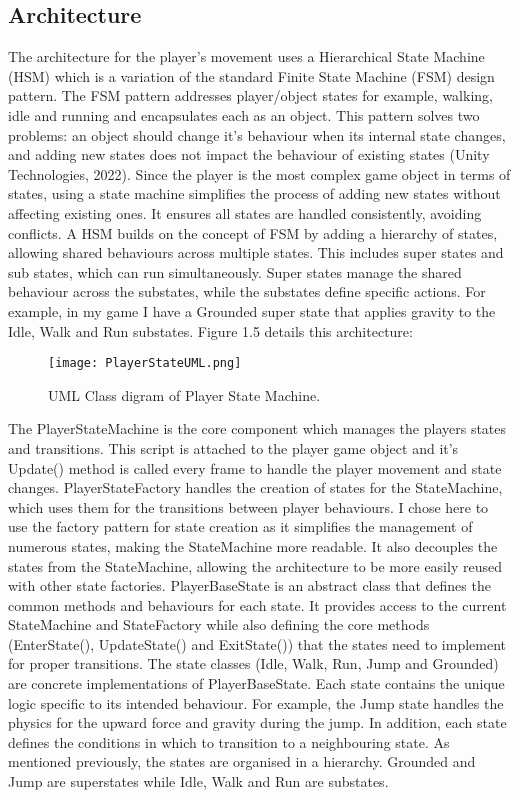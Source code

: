\documentclass[]{final_report}
\begin{document}
\subsection{Architecture}
The architecture for the player's movement uses a Hierarchical State Machine (HSM) which is a variation of the standard Finite State Machine (FSM) design pattern. The FSM pattern addresses player/object states for example, walking, idle and running and encapsulates each as an object. This pattern solves two problems: an object should change it’s behaviour when its internal state changes, and adding new states does not impact the behaviour of existing states (Unity Technologies, 2022). Since the player is the most complex game object in terms of states, using a state machine simplifies the process of adding new states without affecting existing ones.  It ensures all states are handled consistently, avoiding conflicts. A HSM builds on the concept of FSM by adding a hierarchy of states, allowing shared behaviours across multiple states. This includes super states and sub states, which can run simultaneously. Super states manage the shared behaviour across the substates, while the substates define specific actions. For example, in my game I have a Grounded super state that applies gravity to the Idle, Walk and Run substates. Figure 1.5 details this architecture:
\begin{figure}[h!]
    \centering
    \texttt{[image: PlayerStateUML.png]}
    \caption{UML Class digram of Player State Machine.}
    \label{fig:label_name}
\end{figure}
\newline The PlayerStateMachine is the core component which manages the players states and transitions. This script is attached to the player game object and it's Update() method is called every frame to handle the player movement and state changes. PlayerStateFactory handles the creation of states for the StateMachine, which uses them for the transitions between player behaviours. I chose here to use the factory pattern for state creation as it simplifies the management of numerous states, making the StateMachine more readable. It also decouples the states from the StateMachine, allowing the architecture to be more easily reused with other state factories. PlayerBaseState is an abstract class that defines the common methods and behaviours for each state.  It provides access to the current StateMachine and StateFactory while also defining the core methods (EnterState(), UpdateState() and ExitState()) that the states need to implement for proper transitions. The state classes (Idle, Walk, Run, Jump and Grounded) are concrete implementations of PlayerBaseState. Each state contains the unique logic specific to its intended behaviour. For example, the Jump state handles the physics for the upward force and gravity during the jump. In addition, each state defines the conditions in which to transition to a neighbouring state. As mentioned previously, the states are organised in a hierarchy. Grounded and Jump are superstates while Idle, Walk and Run are substates. 
\end{document}
